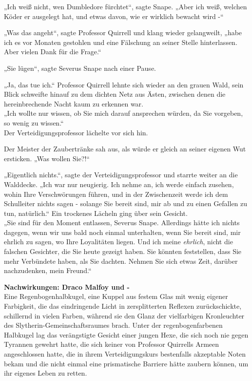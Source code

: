 {„Ich weiß nicht, wen Dumbledore fürchtet“, sagte Snape. „Aber ich weiß, welchen Köder er ausgelegt hat, und etwas davon, wie er wirklich bewacht wird -“

„Was das angeht“, sagte Professor Quirrell und klang wieder gelangweilt, „habe ich es vor Monaten gestohlen und eine Fälschung an seiner Stelle hinterlassen. Aber vielen Dank für die Frage.“

„Sie lügen“, sagte Severus Snape nach einer Pause.

„Ja, das tue ich.“ Professor Quirrell lehnte sich wieder an den grauen Wald, sein Blick schweifte hinauf zu dem dichten Netz aus Ästen, zwischen denen die hereinbrechende Nacht kaum zu erkennen war.\\ „Ich wollte nur wissen, ob Sie mich darauf ansprechen würden, da Sie vorgeben, so wenig zu wissen.“\\ Der Verteidigungsprofessor lächelte vor sich hin.

Der Meister der Zaubertränke sah aus, als würde er gleich an seiner eigenen Wut ersticken. „Was wollen Sie?!“

„Eigentlich nichts.“, sagte der Verteidigungsprofessor und starrte weiter an die Walddecke. „Ich war nur neugierig. Ich nehme an, ich werde einfach zusehen, wohin Ihre Verschwörungen führen, und in der Zwischenzeit werde ich dem Schulleiter nichts sagen - solange Sie bereit sind, mir ab und zu einen Gefallen zu tun, natürlich.“ Ein trockenes Lächeln ging über sein Gesicht.\\ „Sie sind für den Moment entlassen, Severus Snape. Allerdings hätte ich nichts dagegen, wenn wir uns bald noch einmal unterhalten, wenn Sie bereit sind, mir ehrlich zu sagen, wo Ihre Loyalitäten liegen. Und ich meine \emph{ehrlich}, nicht die falschen Gesichter, die Sie heute gezeigt haben. Sie könnten feststellen, dass Sie mehr Verbündete haben, als Sie dachten. Nehmen Sie sich etwas Zeit, darüber nachzudenken, mein Freund.“

\textbf{Nachwirkungen: Draco Malfoy und -}\\ Eine Regenbogenhalbkugel, eine Kuppel aus festem Glas mit wenig eigener Farbigkeit, die das eindringende Licht in zersplitterten Reflexen zurückschickte, schillernd in vielen Farben, während sie den Glanz der vielfarbigen Kronleuchter des Slytherin-Gemeinschaftsraumes brach. Unter der regenbogenfarbenen Halbkugel lag das verängstigte Gesicht einer jungen Hexe, die sich noch nie gegen Tyrannen gewehrt hatte, die sich keiner von Professor Quirrells Armeen angeschlossen hatte, die in ihrem Verteidigungskurs bestenfalls akzeptable Noten bekam und die nicht einmal eine prismatische Barriere hätte zaubern können, um ihr eigenes Leben zu retten.

}
